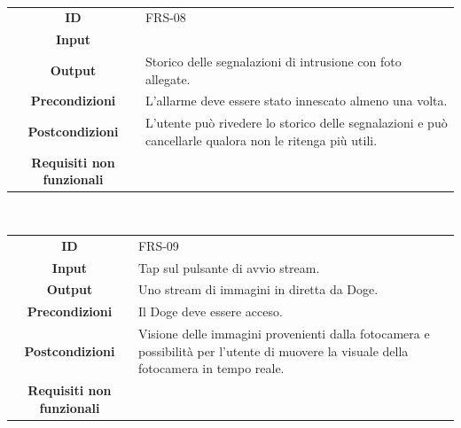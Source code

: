\documentclass{article}
\begin{document}
    ~
    
    \begin{adjustbox}{center}
    \begin{tabular}{|c|p{10cm}|}
    \hline
    \textbf{ID} & FRS-08 \\
    \textbf{Input} &  \\
    \textbf{Output} & Storico delle segnalazioni di intrusione con foto allegate. \\
    \textbf{Precondizioni} & L'allarme deve essere stato innescato almeno una volta. \\
    \textbf{Postcondizioni} & L'utente può rivedere lo storico delle segnalazioni e può cancellarle  qualora non le ritenga più utili. \\
    \textbf{Requisiti non funzionali} &  \\
    \hline
    \end{tabular}
    \end{adjustbox}
    
    ~
    
    \begin{adjustbox}{center}
    \begin{tabular}{|c|p{10cm}|}
    \hline
    \textbf{ID} & FRS-09\\
    \textbf{Input} & Tap sul pulsante di avvio stream.\\
    \textbf{Output} & Uno stream di immagini in diretta da Doge.\\
    \textbf{Precondizioni} & Il Doge deve essere acceso.\\
    \textbf{Postcondizioni} & Visione delle immagini provenienti dalla fotocamera e possibilità per l'utente di muovere la visuale della fotocamera in tempo reale.\\
    \textbf{Requisiti non funzionali} &\\
    \hline
    \end{tabular}
    \end{adjustbox}
    
    
    
\end{document}
